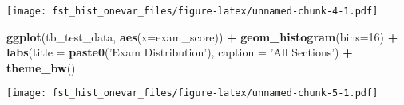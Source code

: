 \documentclass[
]{article}
\newenvironment{Shaded}{\begin{snugshade}}{\end{snugshade}}
\newcommand{\DataTypeTok}[1]{\textcolor[rgb]{0.13,0.29,0.53}{#1}}
\newcommand{\DecValTok}[1]{\textcolor[rgb]{0.00,0.00,0.81}{#1}}
\newcommand{\KeywordTok}[1]{\textcolor[rgb]{0.13,0.29,0.53}{\textbf{#1}}}
\newcommand{\NormalTok}[1]{#1}
\newcommand{\OperatorTok}[1]{\textcolor[rgb]{0.81,0.36,0.00}{\textbf{#1}}}
\newcommand{\StringTok}[1]{\textcolor[rgb]{0.31,0.60,0.02}{#1}}
\begin{document}
\texttt{[image: fst\_hist\_onevar\_files/figure-latex/unnamed-chunk-4-1.pdf]}

\begin{Shaded}
\begin{Highlighting}[]
\KeywordTok{ggplot}\NormalTok{(tb_test_data, }\KeywordTok{aes}\NormalTok{(}\DataTypeTok{x=}\NormalTok{exam_score)) }\OperatorTok{+}
\StringTok{  }\KeywordTok{geom_histogram}\NormalTok{(}\DataTypeTok{bins=}\DecValTok{16}\NormalTok{) }\OperatorTok{+}
\StringTok{  }\KeywordTok{labs}\NormalTok{(}\DataTypeTok{title =} \KeywordTok{paste0}\NormalTok{(}\StringTok{'Exam Distribution'}\NormalTok{),}
       \DataTypeTok{caption =} \StringTok{'All Sections'}\NormalTok{) }\OperatorTok{+}
\StringTok{  }\KeywordTok{theme_bw}\NormalTok{()}
\end{Highlighting}
\end{Shaded}

\texttt{[image: fst\_hist\_onevar\_files/figure-latex/unnamed-chunk-5-1.pdf]}
\end{document}
